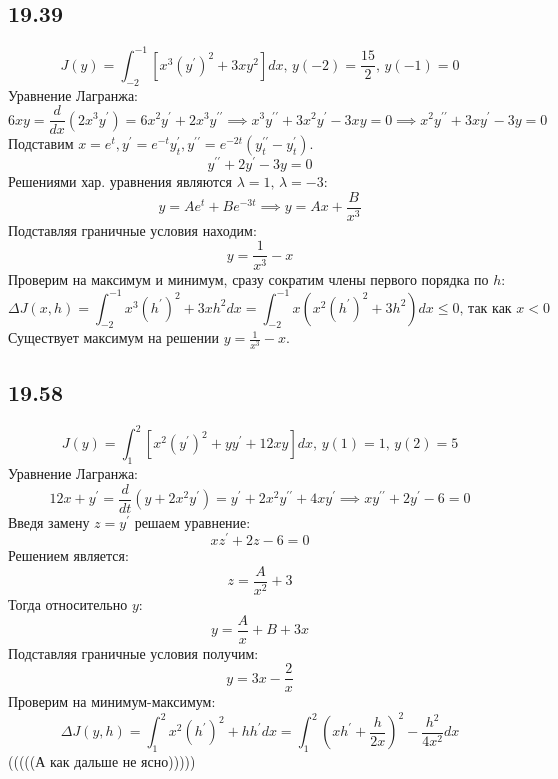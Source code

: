 \documentclass[12pt]{article}
\begin{document}
\subsection*{19.39}
\[
    J(y) = \int_{-2}^{-1} [x^3 (y^{\prime})^2 + 3xy^2]dx, \, y(-2) = \frac{15}{2}, \, y(-1) = 0
\]
Уравнение Лагранжа: 
\[
    6xy = \frac{d}{dx} (2x^3 y^{\prime}) = 6 x^2 y^{\prime} + 2x^3 y^{\prime\prime} \implies 
    x^3 y^{\prime\prime} + 3 x^2 y^{\prime} - 3xy = 0 \implies 
    x^2 y^{\prime\prime} + 3x y^{\prime} - 3y = 0
\]
Подставим $x = e^t, y^{\prime} = e^{-t} y^{\prime}_t, y^{\prime\prime} = e^{-2t} (y^{\prime\prime}_t - y^{\prime}_t)$. 
\[
    y^{\prime\prime} + 2y^{\prime} - 3y = 0
\]
Решениями хар. уравнения являются $\lambda = 1, \, \lambda = -3$: 
\[
    y = A e^t + B e^{-3t} \implies 
    y = A x + \frac{B}{x^3}
\] 
Подставляя граничные условия находим: 
\[
    y = \frac{1}{x^3} - x
\]
Проверим на максимум и минимум, сразу сократим члены первого порядка по $h$: 
\[
    \Delta J(x, h) = 
    \int_{-2}^{-1} x^3 (h^{\prime})^2 + 3x h^2 dx = 
    \int_{-2}^{-1} x \left( x^2 (h^{\prime})^2 + 3 h^2 \right) dx \leq 0, \, \text{так как $x < 0$}  
\]
Существует максимум на решении $y = \frac{1}{x^3} - x$. 
\subsection*{19.58}
\[
    J(y) = \int_{1}^{2} \left[ x^2 (y^{\prime})^2 + y y^{\prime} + 12xy \right] dx, \, y(1) = 1, \, y(2) = 5
\]
Уравнение Лагранжа: 
\[
    12x + y^{\prime} = \frac{d}{dt} \left( y + 2 x^2 y^{\prime} \right) = 
    y^{\prime} + 2x^2 y^{\prime\prime} + 4 x y^{\prime} \implies 
    x y^{\prime\prime} + 2 y^{\prime} - 6 = 0 
\]
Введя замену $z = y^{\prime}$ решаем уравнение: 
\[
    xz^{\prime} + 2z - 6 = 0
\] 
Решением является: 
\[
    z = \frac{A}{x^2} + 3
\]
Тогда относительно $y$: 
\[
    y = \frac{A}{x} + B + 3x
\]
Подставляя граничные условия получим: 
\[
    y = 3x - \frac{2}{x}
\]
Проверим на минимум-максимум:
\[
    \Delta J(y, h) = \int_{1}^{2} x^2(h^{\prime})^2 + h h^{\prime} dx = 
    \int_{1}^{2} \left( xh^{\prime} + \frac{h}{2x} \right)^2 - \frac{h^2}{4x^2} dx 
\]  
(((((А как дальше не ясно)))))
\end{document}
